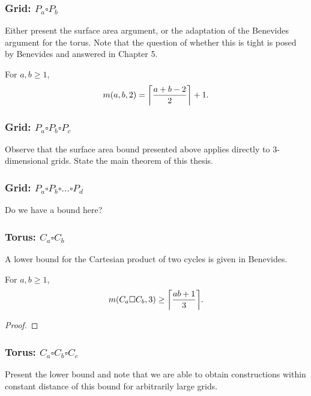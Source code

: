 \subsubsection{Grid: $P_a \square P_b$}

Either present the surface area argument, or the adaptation of the Benevides argument for the torus. Note that the question of whether this is tight is posed by Benevides and answered in Chapter 5.

\begin{thm}
For $a, b \geq 1$,
$$m(a,b,2) = \ceil*{\frac{a+b-2}{2}}+1.$$
\end{thm}

\subsubsection{Grid: $P_a \square P_b \square P_c$}

Observe that the surface area bound presented above applies directly to 3-dimensional grids. State the main theorem of this thesis. 

\subsubsection{Grid: $P_a \square P_b \square \dots \square P_d$}

Do we have a bound here?

\subsubsection{Torus: $C_a \square C_b$}

A lower bound for the Cartesian product of two cycles is given in Benevides.

\begin{thm}
For $a, b \geq 1$,
$$m(C_a \square C_b,3) \geq \ceil*{\frac{ab +1}{3}}.$$
\end{thm}

\begin{proof}
\end{proof}

\subsubsection{Torus: $C_a \square C_b \square C_c$}

Present the lower bound and note that we are able to obtain constructions within constant distance of this bound for arbitrarily large grids.

